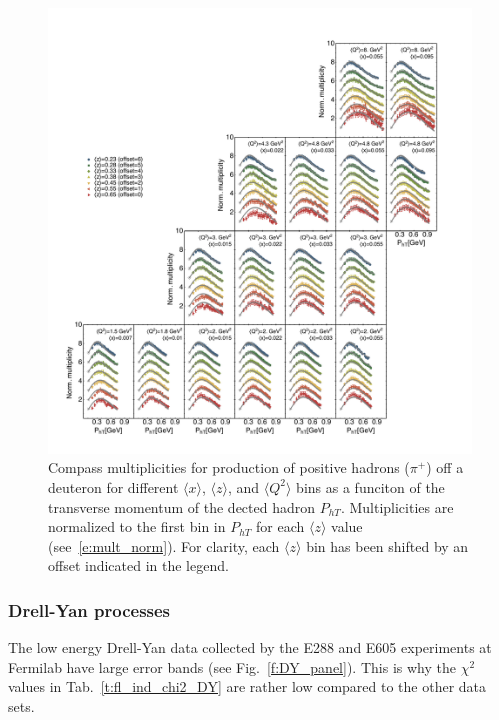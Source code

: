 \documentclass[aps,preprintnumbers,showpacs,nofootinbib,superscriptaddress,floatfix]{revtex4}
\begin{document}
\begin{figure}[h!]
\begin{center}
\includegraphics[width=\textwidth]{plots/COMPASS_SCIplot_flINDEP_Piplus.pdf}
\end{center}
\caption{Compass multiplicities for production of positive hadrons ($\pi^+$) off a deuteron for different $\langle x \rangle$, $\langle z \rangle$, and $\langle Q^2 \rangle$ bins as a funciton of the transverse momentum of the dected hadron $P_{hT}$. Multiplicities are normalized to the first bin in  $P_{hT}$ for each $\langle z \rangle$ value (see~\eqref{e:mult_norm}). For clarity, each $\langle z \rangle$  bin has been shifted by an offset indicated in the legend.} 
\label{f:C_pip}
\end{figure}





\subsubsection*{Drell-Yan processes}
\label{sss:DYZ_agreement}


The low energy Drell-Yan data collected by the E288 and E605 experiments at Fermilab have large error bands (see Fig.~\ref{f:DY_panel}). This is why the $\chi^2$ values in Tab.~\ref{t:fl_ind_chi2_DY} are rather low compared to the other data sets. 
\end{document}
